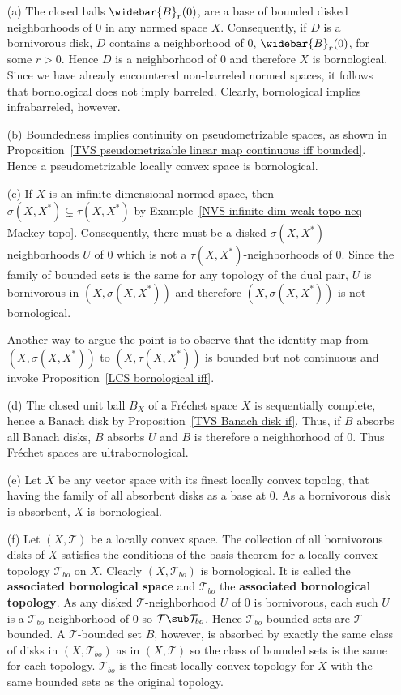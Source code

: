 \begin{example}\label{bornological space eg}
\mbox{}
\begin{itemize}
\item[(a)] The closed balls $\widebar{B}_r(0)$, are a base of bounded disked neighborhoods of $0$ in any normed space $X$. Consequently, if $D$ is a bornivorous disk, $D$ contains a neighborhood of $0$, $\widebar{B}_r(0)$, for some $r>0$. Hence $D$ is a neighborhood of $0$ and therefore $X$ is bornological. Since we have already encountered non-barreled normed spaces, it follows that bornological does not imply barreled. Clearly, bornological implies infrabarreled, however.
\item[(b)] Boundedness implies continuity on pseudometrizable spaces, as shown in Proposition~\ref{TVS pseudometrizable linear map continuous iff bounded}. Hence a pseudometrizablc locally convex space is bornological.
\item[(c)] If $X$ is an infinite-dimensional normed space, then $\sigma(X,X^*)\subsetneq\tau(X,X^*)$ by Example~\ref{NVS infinite dim weak topo neq Mackey topo}. Consequently, there must be a disked $\sigma(X,X^*)$-neighborhoods $U$ of $0$ which is not a $\tau(X,X^*)$-neighborhoods of $0$. Since the family of bounded sets is the same for any topology of the dual pair, $U$ is bornivorous in $(X,\sigma(X,X^*))$ and therefore $(X,\sigma(X,X^*))$ is not bornological.\par
Another way to argue the point is to observe that the identity map from $(X,\sigma(X,X^*))$ to $(X,\tau(X,X^*))$ is bounded but not continuous and invoke Proposition~\ref{LCS bornological iff}.
\item[(d)] The closed unit ball $B_X$ of a Fr\'echet space $X$ is sequentially complete, hence a Banach disk by Proposition~\ref{TVS Banach disk if}. Thus, if $B$ absorbs all Banach disks, $B$ absorbs $U$ and $B$ is therefore a neighhorhood of $0$. Thus Fr\'echet spaces are ultrabornological.
\item[(e)] Let $X$ be any vector space with its finest locally convex topolog, that having the family of all absorbent disks as a base at $0$. As a bornivorous disk is absorbent, $X$ is bornological.
\item[(f)] Let $(X,\mathcal{T})$ be a locally convex space. The collection of all bornivorous disks of $X$ satisfies the conditions of the basis theorem for a locally convex topology $\mathcal{T}_{bo}$ on $X$. Clearly $(X,\mathcal{T}_{bo})$ is bornological. It is called the \textbf{associated bornological space} and $\mathcal{T}_{bo}$ the \textbf{associated bornological topology}. As any disked $\mathcal{T}$-neighborhood $U$ of $0$ is bornivorous, each such $U$ is a $\mathcal{T}_{bo}$-neighborhood of $0$ so $\mathcal{T}\sub\mathcal{T}_{bo}$. Hence $\mathcal{T}_{bo}$-bounded sets are $\mathcal{T}$-bounded. A $\mathcal{T}$-bounded set $B$, however, is absorbed by exactly the same class of disks in $(X,\mathcal{T}_{bo})$ as in $(X,\mathcal{T})$ so the class of bounded sets is the same for each topology. $\mathcal{T}_{bo}$ is the finest locally convex topology for $X$ with the same bounded sets as the original topology.

\end{itemize}
\end{example}
